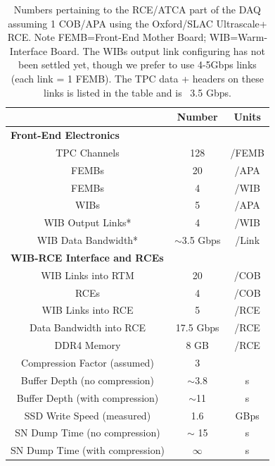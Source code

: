 \begin{table}[htp]
\begin{center}
\begin{tabular}{|c|c|c|}
\hline
     & Number           &     Units \\
     \hline
\multicolumn{3}{|l|}{\bf{Front-End Electronics}} \\
\hline
TPC Channels & 128 & /FEMB \\
FEMBs  & 20  & /APA \\
FEMBs  & 4  & /WIB  \\
WIBs  & 5  & /APA\\
WIB Output Links* & 4 & /WIB\\
WIB Data Bandwidth* & $\sim$3.5 Gbps & /Link\\
\hline
\multicolumn{3}{|l|}{\bf{WIB-RCE Interface and RCEs}} \\
\hline
WIB Links into RTM & 20 & /COB\\
RCEs    & 4  &  /COB\\
WIB Links into RCE & 5 & /RCE\\
Data Bandwidth into RCE & 17.5 Gbps & /RCE\\
DDR4 Memory    & 8 GB & /RCE\\
Compression Factor (assumed)  & 3  &  \\
Buffer Depth (no compression)   &  $\sim$3.8  &  s  \\
Buffer Depth (with compression)   &  $\sim$11  &  s  \\
SSD Write Speed (measured)  & 1.6 & GBps \\ 
SN Dump Time (no compression)  &  $\sim$ 15  & s\\
SN Dump Time (with compression)  &  $\infty$  & s\\
\hline
\end{tabular}
\end{center}
\caption{ Numbers pertaining to the RCE/ATCA part of the DAQ assuming 1 COB/APA using the Oxford/SLAC Ultrascale+ RCE.  Note FEMB=Front-End Mother Board; WIB=Warm-Interface Board.  The WIBs output link configuring has not been settled yet, though we prefer to use 4-5Gbps links (each link = 1 FEMB).  The TPC data + headers on these links is listed in the table and is ~3.5 Gbps. }
\label{tab:apaNums}
\end{table}%







